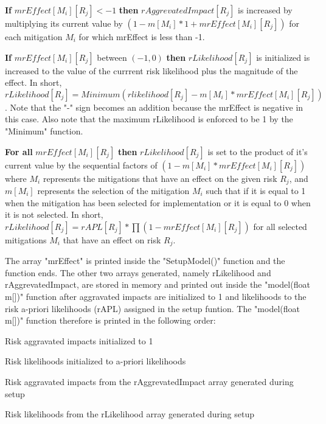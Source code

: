 \begin{footnotesize}\bi
\item \textbf{If} $mrEffect[M_i][R_j] < -1$ \textbf{then} $rAggrevatedImpact[R_j]$
is increased by multiplying its current value by $(1-m[M_i]*1+mrEffect[M_i][R_j])$
for each mitigation $M_i$ for which mrEffect is less than -1.
\item \textbf{If} $mrEffect[M_i][R_j]$ between $(-1,0)$ \textbf{then} $rLikelihood[R_j]$
is initialized is increased to the value of the currrent risk
likelihood plus the magnitude of the effect. In short, \\ $rLikelihood[R_j] = Minimum(
rlikelihood[R_j] - m[M_i] * mrEffect[M_i][R_j])$. Note that the "-" sign becomes
an addition because the mrEffect is negative in this case. Also note that the maximum
rLikelihood is enforced to be 1 by the "Minimum" function.
\item \textbf{For all} $mrEffect[M_i][R_j]$ \textbf{then} $rLikelihood[R_j]$ is
set to the product of it's current value by the sequential factors of 
$(1-m[M_i]* mrEffect[M_i][R_j])$ where $M_i$ represents the mitigations that
have an effect on the given risk $R_j$, and $m[M_i]$ represents the selection of
the mitigation $M_i$ such that if it is equal to 1 when the mitigation has been
selected for implementation or it is equal to 0 when it is not selected. In short,
$rLikelihood[R_j]= rAPL[R_j]*\prod(1- mrEffect[M_i][R_j])$ for all selected 
mitigations $M_i$ that have an effect on risk $R_j$.
\ei\end{footnotesize}

The array "mrEffect" is printed inside the "SetupModel()" function and the
function ends.
The other two arrays generated, namely rLikelihood and rAggrevatedImpact,
are stored in memory and prin\-ted out inside the "model(float m[])" function after 
aggravated impacts are initialized to 1 and likelihoods to the 
risk a-priori likelihoods (rAPL) assigned in the setup funtion. The "model(float m[])"
function therefore is printed in the following order:

\begin{footnotesize}\bi
\item Risk aggravated impacts initialized to 1
\item Risk likelihoods initialized to a-priori likelihoods
\item Risk aggravated impacts from the rAggrevatedImpact array
generated during setup
\item Risk likelihoods from the rLikelihood array generated
during setup
\ei\end{footnotesize}

